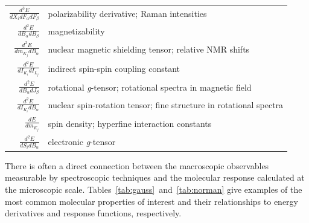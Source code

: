 \documentclass[%
class = book,%
crop = false,%
float = true,%
multi = true,%
preview = false,%
]{standalone}
\begin{document}
\begin{table}
\begin{singlespace}
\begin{tabulary}{0.85\textwidth}{rL}
      \(\frac{d^{3}E}{dX_{i}dF_{\alpha}dF_{\beta}}\) & polarizability derivative; Raman intensities \\
      \(\frac{d^{2}E}{dB_{\alpha}dB_{\beta}}\)       & magnetizability \\
      \(\frac{d^{2}E}{dm_{K_{j}}dB_{\alpha}}\)       & nuclear magnetic shielding tensor; relative NMR shifts \\
      \(\frac{d^{2}E}{dI_{K_{i}}dI_{L_{j}}}\)        & indirect spin-spin coupling constant \\
      \(\frac{d^{2}E}{dB_{\alpha}dJ_{\beta}}\)       & rotational \textit{g}-tensor; rotational spectra in magnetic field \\
      \(\frac{d^{2}E}{dI_{K_{i}}dB_{\alpha}}\)       & nuclear spin-rotation tensor; fine structure in rotational spectra \\
      \(\frac{dE}{dm_{K_{j}}}\)                      & spin density; hyperfine interaction constants \\
      \(\frac{d^{2}E}{dS_{i}dB_{\alpha}}\)           & electronic \textit{g}-tensor \\
      \bottomrule
    \end{tabulary}
  \end{singlespace}
\end{table}


There is often a direct connection between the macroscopic observables measurable by spectroscopic techniques and the molecular response calculated at the microscopic scale. Tables~\ref{tab:gauss}~and~\ref{tab:norman} give examples of the most common molecular properties of interest and their relationships to energy derivatives and response functions, respectively. 
\end{document}

